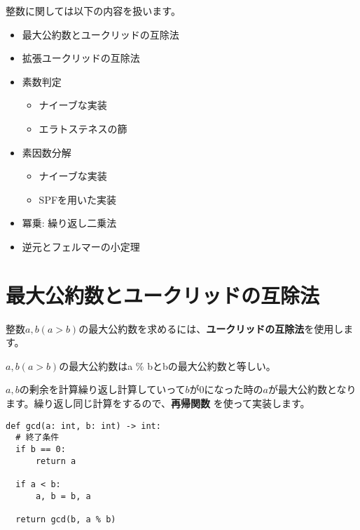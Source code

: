 \documentclass{jlreq}
\begin{document}
 
整数に関しては以下の内容を扱います。

\begin{itemize}
  \item 最大公約数とユークリッドの互除法
  \item 拡張ユークリッドの互除法
  \item 素数判定
  \begin{itemize}
    \item ナイーブな実装
    \item エラトステネスの篩
  \end{itemize}
  \item 素因数分解
  \begin{itemize}
    \item ナイーブな実装
    \item SPFを用いた実装
  \end{itemize}
  \item 冪乗: 繰り返し二乗法
  \item 逆元とフェルマーの小定理
\end{itemize}

\section{最大公約数とユークリッドの互除法}

整数$a, b(a > b)$の最大公約数を求めるには、\textbf{ユークリッドの互除法}を使用します。

\begin{tcolorbox}[enhanced,title=ユークリッドの互除法, 
  attach boxed title to top left, 
  colback=white!95!blue,
  colbacktitle=white!10!blue!50!black,
  drop fuzzy shadow,
  boxrule=0.25mm,
  ]
  $a, b(a > b)$の最大公約数はa \% bとbの最大公約数と等しい。
\end{tcolorbox}

$a, b$の剰余を計算繰り返し計算していって$b$が0になった時の$a$が最大公約数となります。繰り返し同じ計算をするので、\textbf{再帰関数}
を使って実装します。

\begin{lstlisting}[caption=ユークリッドの互助法実装, frame=TRBL, label={euclid}]
def gcd(a: int, b: int) -> int:
  # 終了条件
  if b == 0:
      return a
  
  if a < b:
      a, b = b, a
      
  return gcd(b, a % b)
\end{lstlisting}
\end{document}
